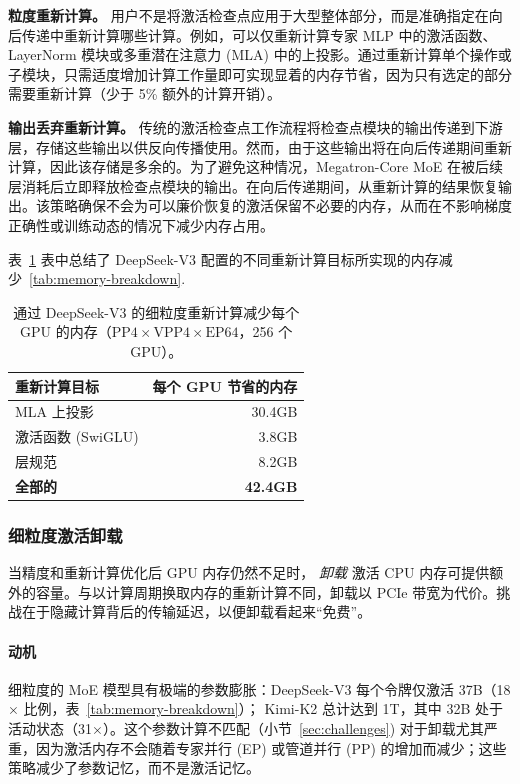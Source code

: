 \documentclass[10pt,logo,copyright]{nvidiatechreport_zh}
\begin{document}
\textbf{粒度重新计算。} 用户不是将激活检查点应用于大型整体部分，而是准确指定在向后传递中重新计算哪些计算。例如，可以仅重新计算专家 MLP 中的激活函数、LayerNorm 模块或多重潜在注意力 (MLA) 中的上投影。通过重新计算单个操作或子模块，只需适度增加计算工作量即可实现显着的内存节省，因为只有选定的部分需要重新计算（少于 5\% 额外的计算开销）。

\textbf{输出丢弃重新计算。} 传统的激活检查点工作流程将检查点模块的输出传递到下游层，存储这些输出以供反向传播使用。然而，由于这些输出将在向后传递期间重新计算，因此该存储是多余的。为了避免这种情况，Megatron-Core MoE 在被后续层消耗后立即释放检查点模块的输出。在向后传递期间，从重新计算的结果恢复输出。该策略确保不会为可以廉价恢复的激活保留不必要的内存，从而在不影响梯度正确性或训练动态的情况下减少内存占用。

表~\ref{tab:recomputation-savings} 表中总结了 DeepSeek-V3 配置的不同重新计算目标所实现的内存减少~\ref{tab:memory-breakdown}.

\begin{table}[ht]
\centering
\caption{通过 DeepSeek-V3 的细粒度重新计算减少每个 GPU 的内存（$\text{PP}4 \times \text{VPP}4 \times \text{EP}64$，256 个 GPU）。}
\label{tab:recomputation-savings}
\begin{tabular}{lr}
\toprule
\textbf{重新计算目标} & \textbf{每个 GPU 节省的内存} \\
\midrule
MLA 上投影 & 30.4GB \\
激活函数 (SwiGLU) & 3.8GB \\
层规范 & 8.2GB \\
\midrule
\textbf{全部的} & \textbf{42.4GB} \\
\bottomrule
\end{tabular}
\end{table}

\subsubsection{细粒度激活卸载}\label{sec:offloading}

当精度和重新计算优化后 GPU 内存仍然不足时， \textit{卸载} 激活 CPU 内存可提供额外的容量。与以计算周期换取内存的重新计算不同，卸载以 PCIe 带宽为代价。挑战在于隐藏计算背后的传输延迟，以便卸载看起来“免费”。

\paragraph{动机}
细粒度的 MoE 模型具有极端的参数膨胀：DeepSeek-V3 每个令牌仅激活 37B（18$\times$ 比例，表~\ref{tab:memory-breakdown}）； Kimi-K2 总计达到 1T，其中 32B 处于活动状态（31$\times$）。这个参数计算不匹配（小节~\ref{sec:challenges}) 对于卸载尤其严重，因为激活内存不会随着专家并行 (EP) 或管道并行 (PP) 的增加而减少；这些策略减少了参数记忆，而不是激活记忆。
\end{document}
